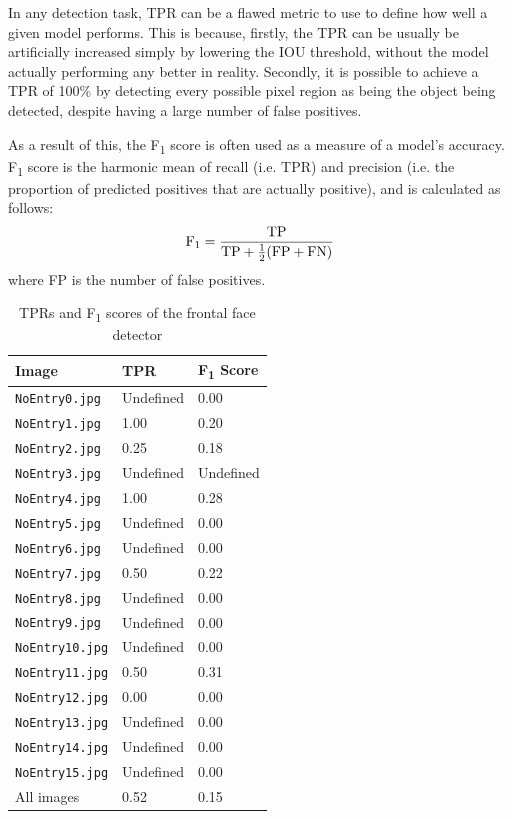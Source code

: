 \documentclass[twocolumn, 10pt, a4paper]{article}
\begin{document}
In any detection task, TPR can be a flawed metric to use to define how well a given model performs.
This is because, firstly, the TPR can be usually be artificially increased simply by lowering the IOU threshold, without the model actually performing any better in reality.
Secondly, it is possible to achieve a TPR of 100\% by detecting every possible pixel region as being the object being detected, despite having a large number of false positives.

As a result of this, the F\textsubscript{1} score is often used as a measure of a model's accuracy.
F\textsubscript{1} score is the harmonic mean of recall (i.e. TPR) and precision (i.e. the proportion of predicted positives that are actually positive), and is calculated as follows:
\[
  \textrm{F\textsubscript{1}} = \frac{\textrm{TP}}{\textrm{TP} + \frac{1}{2}(\textrm{FP} + \textrm{FN})}
\]
where FP is the number of false positives. 

\begin{table}[htbp]
  \begin{center}
  \caption{TPRs and F\textsubscript{1} scores of the frontal face detector}\label{tab:face}
  \begin{tabular}{l | l l} 
    \hline\hline
    Image&TPR&F\textsubscript{1} Score\\
    \hline
    \texttt{NoEntry0.jpg}&Undefined&0.00\\ 
    \texttt{NoEntry1.jpg}&1.00&0.20\\ 
    \texttt{NoEntry2.jpg}&0.25&0.18\\ 
    \texttt{NoEntry3.jpg}&Undefined&Undefined\\ 
    \texttt{NoEntry4.jpg}&1.00&0.28\\ 
    \texttt{NoEntry5.jpg}&Undefined&0.00\\ 
    \texttt{NoEntry6.jpg}&Undefined&0.00\\ 
    \texttt{NoEntry7.jpg}&0.50&0.22\\ 
    \texttt{NoEntry8.jpg}&Undefined&0.00\\ 
    \texttt{NoEntry9.jpg}&Undefined&0.00\\ 
    \texttt{NoEntry10.jpg}&Undefined&0.00\\ 
    \texttt{NoEntry11.jpg}&0.50&0.31\\ 
    \texttt{NoEntry12.jpg}&0.00&0.00\\ 
    \texttt{NoEntry13.jpg}&Undefined&0.00\\ 
    \texttt{NoEntry14.jpg}&Undefined&0.00\\ 
    \texttt{NoEntry15.jpg}&Undefined&0.00\\ 
    \hdashline
    All images&0.52&0.15\\ 
    \hline
  \end{tabular}
  \end{center}
\end{table} 
\end{document}
